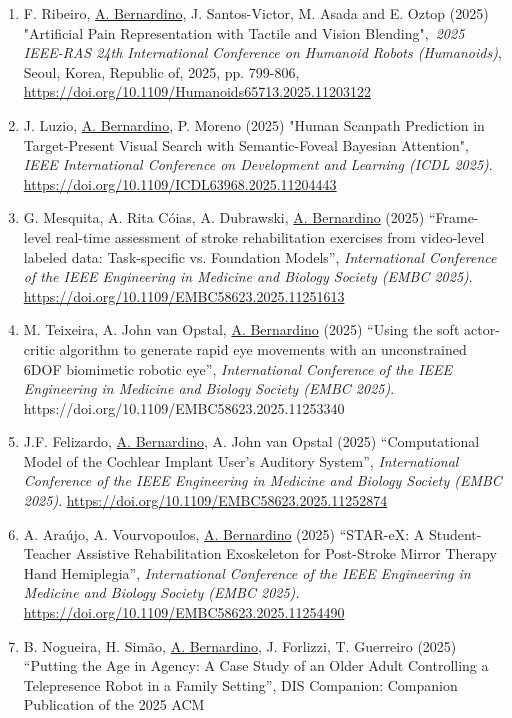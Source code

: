 \documentclass[
]{article}
\begin{document}
\begin{enumerate}
  \url{https://doi.org/10.1007/978-3-031-99568-2_14}
\item
  F. Ribeiro, \ul{A. Bernardino}, J. Santos-Victor, M. Asada and E.
  Oztop (2025) "Artificial Pain Representation with Tactile and Vision
  Blending",~\emph{2025 IEEE-RAS 24th International Conference on
  Humanoid Robots (Humanoids)}, Seoul, Korea, Republic of, 2025, pp.
  799-806, \url{https://doi.org/10.1109/Humanoids65713.2025.11203122}
\item
  J. Luzio, \ul{A. Bernardino}, P. Moreno (2025) "Human Scanpath
  Prediction in Target-Present Visual Search with Semantic-Foveal
  Bayesian Attention", \emph{IEEE International Conference on
  Development and Learning (ICDL 2025)}.
  \url{https://doi.org/10.1109/ICDL63968.2025.11204443}
\item
  G. Mesquita, A. Rita Cóias, A. Dubrawski, \ul{A. Bernardino} (2025)
  ``Frame-level real-time assessment of stroke rehabilitation exercises
  from video-level labeled data: Task-specific vs. Foundation Models'',
  \emph{International Conference of the IEEE Engineering in Medicine and
  Biology Society (EMBC 2025)}.
  \url{https://doi.org/10.1109/EMBC58623.2025.11251613}
\item
  M. Teixeira, A. John van Opstal, \ul{A. Bernardino} (2025) ``Using the
  soft actor-critic algorithm to generate rapid eye movements with an
  unconstrained 6DOF biomimetic robotic eye'', \emph{International
  Conference of the IEEE Engineering in Medicine and Biology Society
  (EMBC 2025)}. https://doi.org/10.1109/EMBC58623.2025.11253340
\item
  J.F. Felizardo, \ul{A. Bernardino}, A. John van Opstal (2025)
  ``Computational Model of the Cochlear Implant User's Auditory
  System'', \emph{International Conference of the IEEE Engineering in
  Medicine and Biology Society (EMBC 2025)}.
  \url{https://doi.org/10.1109/EMBC58623.2025.11252874}
\item
  A. Araújo, A. Vourvopoulos, \ul{A. Bernardino} (2025) ``STAR-eX: A
  Student-Teacher Assistive Rehabilitation Exoskeleton for Post-Stroke
  Mirror Therapy Hand Hemiplegia'', \emph{International Conference of
  the IEEE Engineering in Medicine and Biology Society (EMBC 2025).}
  \url{https://doi.org/10.1109/EMBC58623.2025.11254490}
\item
  B. Nogueira, H. Simão, \ul{A. Bernardino}, J. Forlizzi, T. Guerreiro
  (2025) ``Putting the Age in Agency: A Case Study of an Older Adult
  Controlling a Telepresence Robot in a Family Setting'', DIS
   Companion: Companion Publication of the 2025 ACM

\end{enumerate}
\end{document}
